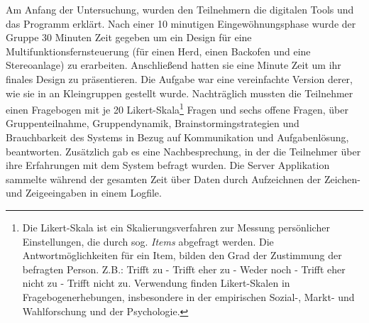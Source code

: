 \medskip Am Anfang der Untersuchung, wurden den Teilnehmern die digitalen Tools und das Programm erklärt. Nach einer 10 minutigen Eingewöhnungsphase wurde der Gruppe 30 Minuten Zeit gegeben um ein Design für eine Multifunktionsfernsteuerung (für einen Herd, einen Backofen und eine Stereoanlage) zu erarbeiten. Anschließend hatten sie eine Minute Zeit um ihr finales Design zu präsentieren. Die Aufgabe war eine vereinfachte Version derer, wie sie in \citep{Tang1991143} an Kleingruppen gestellt wurde. Nachträglich mussten die Teilnehmer einen Fragebogen mit je 20 Likert-Skala\footnote{Die Likert-Skala ist ein Skalierungsverfahren zur Messung persönlicher Einstellungen, die durch sog. \emph{Items} abgefragt werden. Die Antwortmöglichkeiten für ein Item, bilden den Grad der Zustimmung der befragten Person. Z.B.: Trifft zu - Trifft eher zu - Weder noch - Trifft eher nicht zu - Trifft nicht zu. Verwendung finden Likert-Skalen in Fragebogenerhebungen, insbesondere in der empirischen Sozial-, Markt- und Wahlforschung und der Psychologie.} Fragen und sechs offene Fragen, über Gruppenteilnahme, Gruppendynamik, Brainstormingstrategien und Brauchbarkeit des Systems in Bezug auf Kommunikation und Aufgabenlösung, beantworten. Zusätzlich gab es eine Nachbesprechung, in der die Teilnehmer über ihre Erfahrungen mit dem System befragt wurden. Die Server Applikation sammelte während der gesamten Zeit über Daten durch Aufzeichnen der Zeichen- und Zeigeeingaben in einem Logfile.

